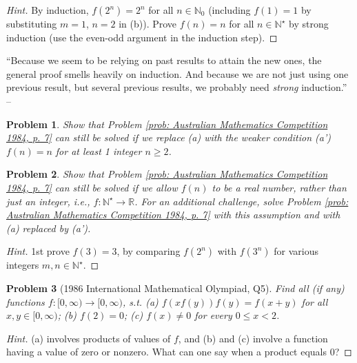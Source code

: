 \documentclass{article}
\numberwithin{equation}{section}
\newtheorem{problem}{Problem}[section]
\begin{document}
\begin{proof}[Hint]
	By induction, $f(2^n) = 2^n$ for all $n\in\mathbb{N}_0$ (including $f(1) = 1$ by substituting $m = 1$, $n = 2$ in (b)). Prove $f(n) = n$ for all $n\in\mathbb{N}^\star$ by strong induction (use the even-odd argument in the induction step). 
\end{proof}
``Because we seem to be relying on past results to attain the new ones, the general proof smells heavily on induction. And because we are not just using one previous result, but several previous results, we probably need \textit{strong} induction.'' -- \cite[p. 40]{Tao2006}

\begin{problem}
	Show that Problem \ref{prob: Australian Mathematics Competition 1984, p. 7} can still be solved if we replace (a) with the weaker condition (a') $f(n) = n$ for at least 1 integer $n\ge 2$.
\end{problem}

\begin{problem}
	Show that Problem \ref{prob: Australian Mathematics Competition 1984, p. 7} can still be solved if we allow $f(n)$ to be a real number, rather than just an integer, i.e., $f:\mathbb{N}^\star\to\mathbb{R}$. For an additional challenge, solve Problem \ref{prob: Australian Mathematics Competition 1984, p. 7} with this assumption and with (a) replaced by (a').
\end{problem}

\begin{proof}[Hint]
	1st prove $f(3) = 3$, by comparing $f(2^n)$ with $f(3^n)$ for various integers $m,n\in\mathbb{N}^\star$.
\end{proof}

\begin{problem}[1986 International Mathematical Olympiad, Q5]
	Find all (if any) functions $f:[0,\infty)\to[0,\infty)$, s.t. (a) $f(xf(y))f(y) = f(x + y)$ for all $x,y\in[0,\infty)$; (b) $f(2) = 0$; (c) $f(x)\ne 0$ for every $0\le x < 2$.
\end{problem}

\begin{proof}[Hint]
	(a) involves products of values of $f$, and (b) and (c) involve a function having a value of zero or nonzero. What can one say when a product equals 0?
\end{proof}
\end{document}
